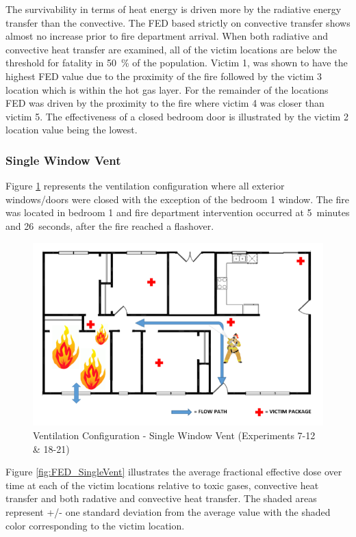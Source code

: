 \documentclass[12pt,oneside]{book}
\begin{document}
The survivability in terms of heat energy is driven more by the radiative energy transfer than the convective. The FED based strictly on convective transfer shows almost no increase prior to fire department arrival. When both radiative and convective heat transfer are examined, all of the victim locations are below the threshold for fatality in 50~\% of the population. Victim 1, was shown to have the highest FED value due to the proximity of the fire followed by the victim 3 location which is within the hot gas layer. For the remainder of the locations FED was driven by the proximity to the fire where victim 4 was closer than victim 5. The effectiveness of a closed bedroom door is illustrated by the victim 2 location value being the lowest. 

\subsubsection{Single Window Vent}

Figure \ref{fig:Vent_Profile-Single_Vent} represents the ventilation configuration where all exterior windows/doors were closed with the exception of the bedroom 1 window. The fire was located in bedroom 1 and fire department intervention occurred  at 5~minutes and 26~seconds, after the fire reached a flashover. 

\begin{figure}[H]
	\centering
	\includegraphics[width=.65\textwidth]{../0_Images/Ventilation_Configurations/Single_Vent.png}
	\caption{Ventilation Configuration - Single Window Vent (Experiments 7-12 \& 18-21)}
	\label{fig:Vent_Profile-Single_Vent}
\end{figure}

Figure \ref{fig:FED_SingleVent} illustrates the average fractional effective dose over time at each of the victim locations relative to toxic gases, convective heat transfer and both radative and convective heat transfer. The shaded areas represent +/- one standard deviation from the average value with the shaded color corresponding to the victim location. 
\end{document}
